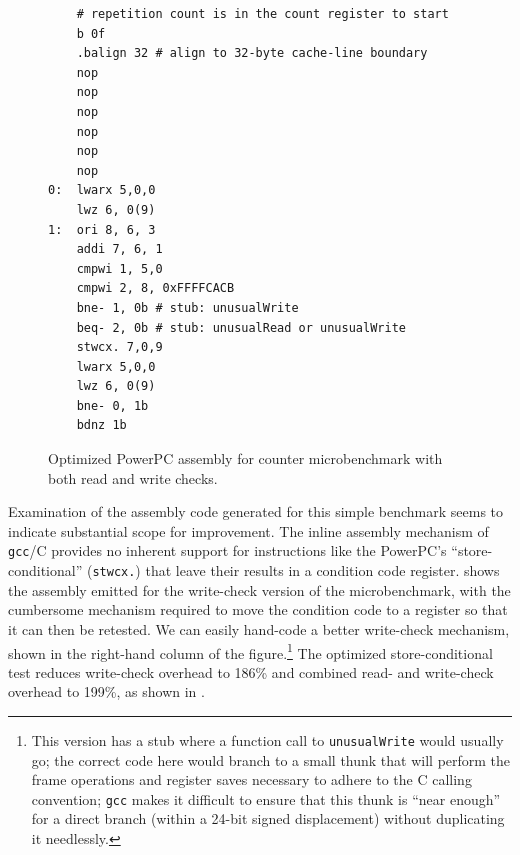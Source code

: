 \begin{figure}
\sis\fontsize{9}{10}\begin{verbatim}
    # repetition count is in the count register to start
    b 0f
    .balign 32 # align to 32-byte cache-line boundary
    nop
    nop
    nop
    nop
    nop
    nop
0:  lwarx 5,0,0
    lwz 6, 0(9)
1:  ori 8, 6, 3
    addi 7, 6, 1
    cmpwi 1, 5,0
    cmpwi 2, 8, 0xFFFFCACB
    bne- 1, 0b # stub: unusualWrite
    beq- 2, 0b # stub: unusualRead or unusualWrite
    stwcx. 7,0,9
    lwarx 5,0,0
    lwz 6, 0(9)
    bne- 0, 1b
    bdnz 1b
\end{verbatim}
\caption{Optimized PowerPC assembly for counter microbenchmark with both read
  and write checks.}
\label{fig:rw-assem}
\end{figure}
Examination of the assembly code generated for this simple benchmark
seems to indicate substantial scope for improvement.  The inline
assembly mechanism of \texttt{gcc}/C provides no inherent support for
instructions 
like the PowerPC's ``store-conditional'' (\texttt{stwcx.}) that leave
their results in a condition code register.  
shows the assembly emitted for the write-check version of the
microbenchmark, with the cumbersome mechanism required to move the
condition code to a register so that it can then be retested.  We can
easily hand-code a better write-check mechanism, shown in the
right-hand column of the figure.\footnote{This version has a stub where a
function call to \texttt{unusualWrite} would usually go; the correct
code here would branch to a small thunk that will perform the
frame operations and register saves necessary to adhere to the C
calling convention; \texttt{gcc} makes it difficult to ensure that
this thunk is ``near enough'' for a direct branch (within a 24-bit
signed displacement) without duplicating it needlessly.}
The optimized store-conditional test reduces write-check overhead to
186\% and combined read- and write-check overhead to 199\%, as shown
in .


